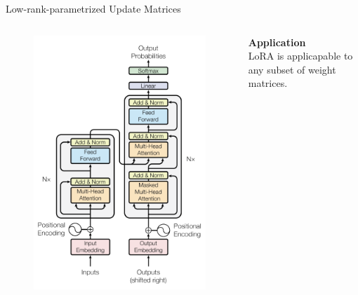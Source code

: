 \documentclass[aspectratio=169,xcolor=dvipsnames]{beamer}
\begin{document}
\begin{frame}{Low-rank-parametrized Update Matrices}
    \begin{columns}
        \begin{column}{0.3\textwidth}
            \begin{figure}
                \centering
                \includegraphics[width=1\linewidth]{figures/transformer_architecture.png}
            \end{figure}
        \end{column}
        \begin{column}{0.7\textwidth}
            \textbf{Application} \\
             LoRA is applicapable to any subset of weight matrices.\\
             \bigskip
            

\end{column}
\end{columns}
\end{frame}
\end{document}
